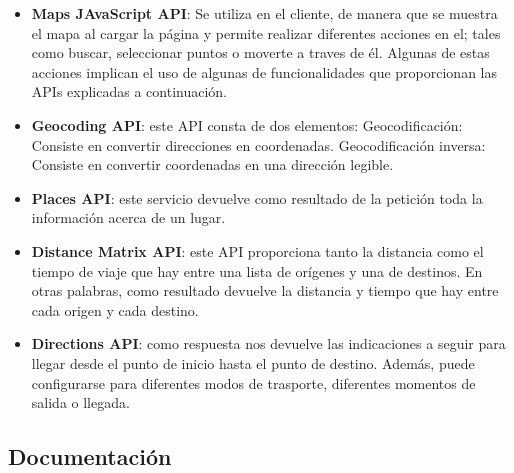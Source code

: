 \begin{itemize}
	\item \textbf{Maps JAvaScript API}: Se utiliza en el cliente, de manera que se muestra el mapa al cargar la página y permite realizar diferentes acciones en el; tales como buscar, seleccionar puntos o moverte a traves de él. Algunas de estas acciones implican el uso de algunas de funcionalidades que proporcionan las APIs explicadas a continuación.
	\item \textbf{Geocoding API}: este API consta de dos elementos:
	\subitem Geocodificación: Consiste en convertir direcciones en coordenadas.
	\subitem Geocodificación inversa: Consiste en convertir coordenadas en una dirección legible.
	\item \textbf{Places API}: este servicio devuelve como resultado de la petición toda la información acerca de un lugar.
	\item \textbf{Distance Matrix API}: este API proporciona tanto la distancia como el tiempo de viaje que hay entre una lista de orígenes y una de destinos. En otras palabras, como resultado devuelve la distancia y tiempo que hay entre cada origen y cada destino.
	\item \textbf{Directions API}: como respuesta nos devuelve las indicaciones a seguir para llegar desde el punto de inicio hasta el punto de destino. Además, puede configurarse para diferentes modos de trasporte, diferentes momentos de salida o llegada.
\end{itemize}




\subsection{Documentación}



